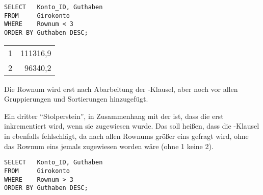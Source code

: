 \begin{lstlisting}[language=oracle_sql,caption={Falsche Anwendung der Rownum-Pseudospalte},label=sql06_12]
SELECT   Konto_ID, Guthaben
FROM     Girokonto
WHERE    Rownum < 3
ORDER BY Guthaben DESC;
          \end{lstlisting}
\begin{center}
    \begin{small}
        \tablehead{}

        \begin{oraclesql}
            \begin{supertabular}{rr}
                1 & 111316,9 \\
                2 & 96340,2 \\
            \end{supertabular}
        \end{oraclesql}
    \end{small}
\end{center}
\begin{merke}
    Die Rownum wird erst nach Abarbeitung der \WHERE-Klausel, aber noch vor allen Gruppierungen und Sortierungen hinzugefügt.
\end{merke}
\clearpage
Ein dritter \enquote{Stolperstein}, in Zusammenhang mit der  ist, dass die  erst inkrementiert wird, wenn sie zugewiesen wurde. Das soll heißen, dass die \WHERE-Klausel in  ebenfalls fehlschlägt, da nach allen Rownums größer eins gefragt wird, ohne das Rownum eins jemals zugewiesen worden wäre (ohne 1 keine 2).
\begin{lstlisting}[language=oracle_sql,caption={Erneut eine falsche Anwendung der Rownum},label=sql06_13]
SELECT   Konto_ID, Guthaben
FROM     Girokonto
WHERE    Rownum > 3
ORDER BY Guthaben DESC;
          \end{lstlisting}
